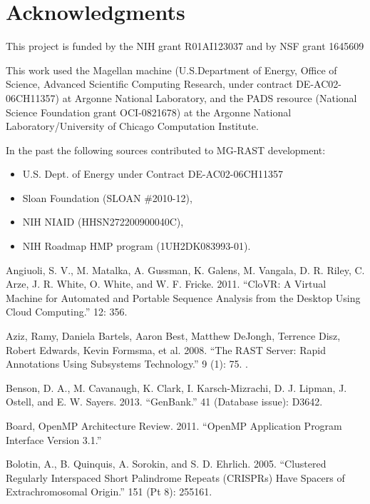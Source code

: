 \documentclass[letterpaper,10pt,english]{sphinxmanual}
\begin{document}
\section{Acknowledgments}
\label{\detokenize{api:acknowledgments}}
This project is funded by the NIH grant R01AI123037 and by NSF grant
1645609

This work used the Magellan machine (U.S.Department of Energy, Office of
Science, Advanced Scientific Computing Research, under contract
DE-AC02-06CH11357) at Argonne National Laboratory, and the PADS resource
(National Science Foundation grant OCI-0821678) at the Argonne National
Laboratory/University of Chicago Computation Institute.

In the past the following sources contributed to MG-RAST development:
\begin{itemize}
\item {} 
U.S. Dept. of Energy under Contract DE-AC02-06CH11357

\item {} 
Sloan Foundation (SLOAN \#2010-12),

\item {} 
NIH NIAID (HHSN272200900040C),

\item {} 
NIH Roadmap HMP program (1UH2DK083993-01).

\end{itemize}

Angiuoli, S. V., M. Matalka, A. Gussman, K. Galens, M. Vangala, D.
R. Riley, C. Arze, J. R. White, O. White, and W. F. Fricke. 2011.
“CloVR: A Virtual Machine for Automated and Portable Sequence
Analysis from the Desktop Using Cloud Computing.”  12: 356.

Aziz, Ramy, Daniela Bartels, Aaron Best, Matthew DeJongh, Terrence
Disz, Robert Edwards, Kevin Formsma, et al. 2008. “The RAST
Server: Rapid Annotations Using Subsystems Technology.”  9 (1): 75. .

Benson, D. A., M. Cavanaugh, K. Clark, I. Karsch-Mizrachi, D. J.
Lipman, J. Ostell, and E. W. Sayers. 2013. “GenBank.”  41 (Database issue): D36\textendash{}42.

Board, OpenMP Architecture Review. 2011. “OpenMP Application
Program Interface Version 3.1.”

Bolotin, A., B. Quinquis, A. Sorokin, and S. D. Ehrlich. 2005.
“Clustered Regularly Interspaced Short Palindrome Repeats
(CRISPRs) Have Spacers of Extrachromosomal Origin.” 
151 (Pt 8): 2551\textendash{}61.
\end{document}
